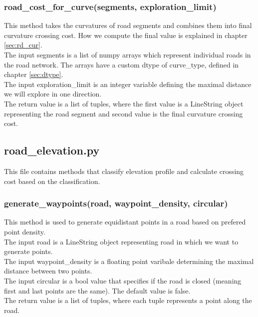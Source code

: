 \documentclass[oneside]{article}
\begin{document}
            \subsubsection{road\_cost\_for\_curve(segments, exploration\_limit)}
            This method takes the curvatures of road segments and combines them into final curvature crossing cost. How we compute the final value is explained in chapter \ref{sec:rd_cur}.\\
            The input segments is a list of numpy arrays which represent individual roads in the road network. The arrays have a custom dtype of curve\_type, defined in chapter \ref{sec:dtype}.\\
            The input exploration\_limit is an integer variable defining the maximal distance we will explore in one direction.\\
            The return value is a list of tuples, where the first value is a LineString object representing the road segment and second value is the final curvature crossing cost.

        \subsection{road\_elevation.py}
        This file contains methods that classify elevation profile and calculate crossing cost based on the classification.

            \subsubsection{generate\_waypoints(road, waypoint\_density, circular)}
            This method is used to generate equidistant points in a road based on prefered point density.\\
            The input road is a LineString object representing road in which we want to generate points.\\
            The input waypoint\_density is a floating point varibale determining the maximal distance between two points.\\
            The input circular is a bool value that specifies if the road is closed (meaning first and last points are the same). The default value is false.\\
            The return value is a list of tuples, where each tuple represents a point along the road.
\end{document}
